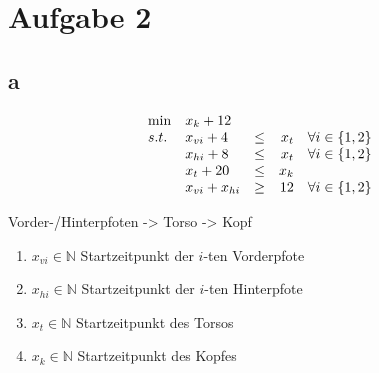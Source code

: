 \documentclass[10pt]{article}
\begin{document}
\section*{Aufgabe 2}
  \subsection*{a}
    \begin{displaymath}
      \begin{array}{l l c r r }
        \min & x_{k} + 12 & & &  \\
        s.t. & x_{vi} + 4 & \leq & x_{t} & \forall i\in \{1,2\} \\
             & x_{hi} + 8 & \leq & x_{t} & \forall i\in \{1,2\} \\
             & x_{t} + 20 & \leq & x_{k} & \\
             & x_{vi} + x_{hi} & \geq & 12 & \forall i\in\{1,2\}
      \end{array}
    \end{displaymath}

    Vorder-/Hinterpfoten -> Torso -> Kopf

    \begin{enumerate}
      \item $x_{vi}\in \mathbb{N}$ Startzeitpunkt der $i$-ten Vorderpfote
      \item $x_{hi}\in \mathbb{N}$ Startzeitpunkt der $i$-ten Hinterpfote
      \item $x_{t}\in \mathbb{N}$ Startzeitpunkt des Torsos
      \item $x_{k}\in \mathbb{N}$ Startzeitpunkt des Kopfes
    \end{enumerate}
\end{document}
